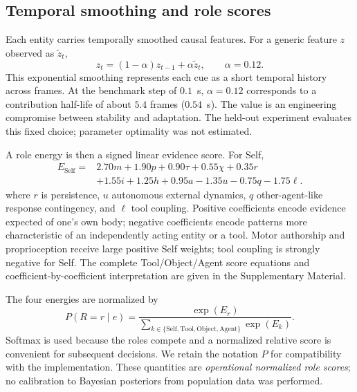 \documentclass[journal]{IEEEtran}
\newcommand{\Self}{\mathrm{Self}}
\newcommand{\Tool}{\mathrm{Tool}}
\newcommand{\Object}{\mathrm{Object}}
\newcommand{\Agent}{\mathrm{Agent}}
\begin{document}
\subsection{Temporal smoothing and role scores}
Each entity carries temporally smoothed causal features. For a generic feature $z$ observed as $\tilde z_t$,
\begin{equation}
z_t=(1-\alpha)z_{t-1}+\alpha\tilde z_t,\qquad \alpha=0.12.
\label{eq:ewma}
\end{equation}
This exponential smoothing represents each cue as a short temporal history across frames. At the benchmark step of $0.1$~s, $\alpha=0.12$ corresponds to a contribution half-life of about $5.4$ frames ($0.54$~s). The value is an engineering compromise between stability and adaptation. The held-out experiment evaluates this fixed choice; parameter optimality was not estimated.

A role energy is then a signed linear evidence score. For Self,
\begin{equation}
\begin{aligned}
E_{\Self}={}&2.70m+1.90p+0.90\tau+0.55\chi+0.35r \\
&+1.55i+1.25h+0.95a-1.35u-0.75q-1.75\ell.
\end{aligned}
\label{eq:selfenergy}
\end{equation}
where $r$ is persistence, $u$ autonomous external dynamics, $q$ other-agent-like response contingency, and $\ell$ tool coupling. Positive coefficients encode evidence expected of one's own body; negative coefficients encode patterns more characteristic of an independently acting entity or a tool. Motor authorship and proprioception receive large positive Self weights; tool coupling is strongly negative for Self. The complete Tool/Object/Agent score equations and coefficient-by-coefficient interpretation are given in the Supplementary Material.

The four energies are normalized by
\begin{equation}
P(R=r\mid e)=\frac{\exp(E_r)}{\sum_{k\in\{\Self,\Tool,\Object,\Agent\}}\exp(E_k)}.
\label{eq:softmax}
\end{equation}
Softmax is used because the roles compete and a normalized relative score is convenient for subsequent decisions. We retain the notation $P$ for compatibility with the implementation. These quantities are \emph{operational normalized role scores}; no calibration to Bayesian posteriors from population data was performed.
\end{document}
